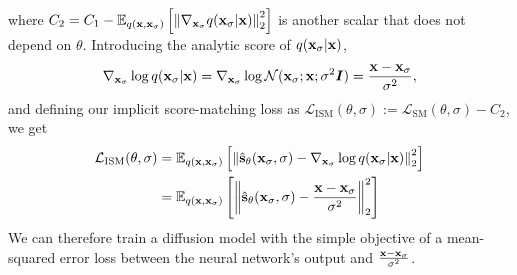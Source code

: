 where $C_2 = C_1 - \mathbb{E}_{q({\mathbf{x}}, {\mathbf{x}}_\sigma)}\left[ \left\| \nabla_{{\mathbf{x}}_\sigma} q({\mathbf{x}}_\sigma|{\mathbf{x}}) \right\|_2^2 \right]$ is another scalar that does not depend on $\theta$. Introducing the analytic score of $q({\mathbf{x}}_\sigma|{\mathbf{x}})$,
\begin{equation}
    \nabla_{{\mathbf{x}}_\sigma} \log q({\mathbf{x}}_\sigma|{\mathbf{x}}) = \nabla_{{\mathbf{x}}_\sigma} \log {\mathcal{N}}({\mathbf{x}}_\sigma; {\mathbf{x}}; \sigma^2{\bm{I}}) = \frac{{\mathbf{x}}-{\mathbf{x}}_\sigma}{\sigma^2},
\end{equation}
and defining our implicit score-matching loss as $\mathcal{L}_\text{ISM}(\theta, \sigma) := \mathcal{L}_\text{SM}(\theta, \sigma) - C_2$, we get
\begin{align} \label{eq:ism-loss}
    \mathcal{L}_\text{ISM}(\theta, \sigma) &= \mathbb{E}_{q({\mathbf{x}}, {\mathbf{x}}_\sigma)} \left[ 
    \left\| \hat{{\mathbf{s}}}_\theta({\mathbf{x}}_\sigma, \sigma) - \nabla_{{\mathbf{x}}_\sigma} \log q({\mathbf{x}}_\sigma|{\mathbf{x}}) \right\|_2^2 \right] \\
    &= \mathbb{E}_{q({\mathbf{x}}, {\mathbf{x}}_\sigma)} \left[  \label{eq:ism-loss-ve}
    \left\| \hat{{\mathbf{s}}}_\theta({\mathbf{x}}_\sigma, \sigma) - \frac{{\mathbf{x}}-{\mathbf{x}}_\sigma}{\sigma^2} \right\|_2^2 \right]
\end{align}
We can therefore train a diffusion model with the simple objective of a mean-squared error loss between the neural network's output and $\frac{{\mathbf{x}}-{\mathbf{x}}_\sigma}{\sigma^2}$.

